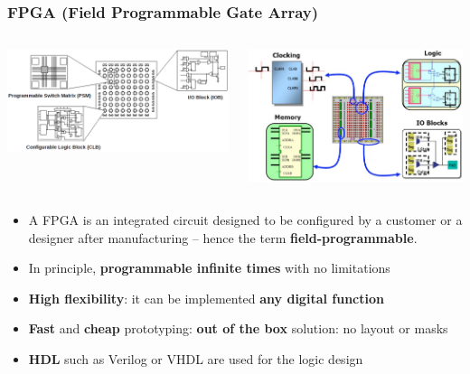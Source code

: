 \documentclass[aspectratio=169]{beamer}
\begin{document}
		\begin{frame}
	\frametitle{FPGA  (\textbf{F}ield \textbf{P}rogrammable \textbf{G}ate \textbf{A}rray)}
	\begin{columns}
		\begin{center}
			\includegraphics[width=0.7 \textwidth]{IMG/FPGA_PARTS}
		\end{center}
		\begin{center}
			\includegraphics[width=0.6 \textwidth]{IMG/FPGA2}
		\end{center}
	\end{columns}
		\vspace{2mm}
		\begin{itemize}
			\item A FPGA is an integrated circuit designed to be configured by a customer or a designer after manufacturing – hence the term \textbf{field-programmable}. 
			\item In principle, \textbf{programmable infinite times} with no limitations
			\item \textbf{High flexibility}: it can be implemented \textbf{any digital function}
			\item \textbf{Fast} and \textbf{cheap} prototyping: \textbf{out of the box} solution: no layout or masks
			\item \textbf{HDL} such as Verilog or VHDL are used for the logic design 
		\end{itemize}
	\end{frame}
\end{document}
